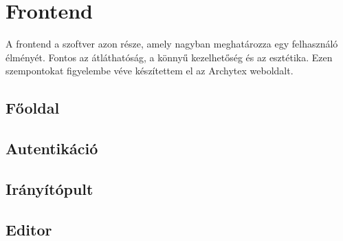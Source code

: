 \chapter{Frontend}
A frontend a szoftver azon része, amely nagyban meghatározza egy felhasználó élményét. Fontos az átláthatóság, a könnyű kezelhetőség és az esztétika. Ezen szempontokat figyelembe véve készítettem el az Archytex weboldalt.

\section{Főoldal}
\section{Autentikáció}
\section{Irányítópult}
\section{Editor}